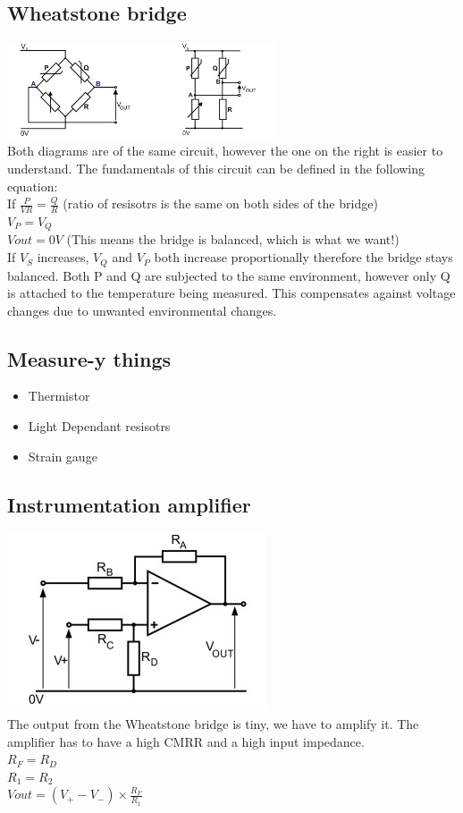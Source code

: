 \documentclass[a4paper, 11pt, twocolumn]{article}
\begin{document}
    \subsection{Wheatstone bridge}
    \includegraphics[width=8cm]{wheatstoneBridge.jpg} \\
    Both diagrams are of the same circuit, however the one on the right is easier to understand.
    The fundamentals of this circuit can be defined in the following equation: \\
    If $\frac{P}{VR}=\frac{Q}{R} $ (ratio of resisotrs is the same on both sides of the bridge)\\
    $V_P = V_Q$\\
    $Vout = 0V$ (This means the bridge is balanced, which is what we want!) \\
    If $V_S$ increases, $V_Q$ and $V_P$ both increase proportionally therefore the bridge stays balanced.
    Both P and Q are subjected to the same environment, however only Q is attached to the temperature being measured. This compensates against voltage changes due to unwanted environmental changes.
    \subsection{Measure-y things}
    \begin{itemize}
        \item Thermistor
        \item Light Dependant resisotrs
        \item Strain gauge
    \end{itemize}
    \subsection{Instrumentation amplifier}
    \includegraphics{instrumentationAmp.jpg} \\
    The output from the Wheatstone bridge is tiny, we have to amplify it. The amplifier has to have a high CMRR and a high input impedance. \\
    $R_F = R_D$\\
    $R_1 = R_2$\\
    $Vout = (V_+ - V_-)\times\frac{R_F}{R_1}$ \\
\end{document}
